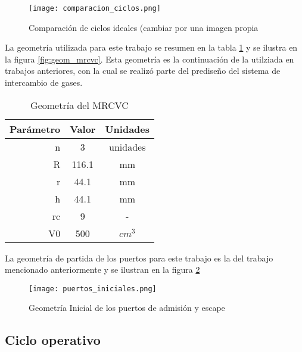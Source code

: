 \begin{figure}
    \centering
    \texttt{[image: comparacion\_ciclos.png]}
    \caption{Comparación de ciclos ideales (cambiar por una imagen propia}
    \label{fig:comparacion_ciclos}
\end{figure}

La geometría utilizada para este trabajo se resumen en la tabla
\ref{tab:geom_mrcvc} y se ilustra en la figura \ref{fig:geom_mrcvc}.
%
Esta geometría es la continuación de la utilziada en trabajos anteriores, con
la cual se realizó parte del prediseño del sistema de intercambio de gases.

\begin{table}
    \centering
    \begin{tabular}{rcc} \toprule
        Parámetro & Valor & Unidades \\ \midrule
        n & 3 & unidades \\
        R & 116.1 & mm \\
        r & 44.1 & mm \\
        h & 44.1 & mm \\
        rc & 9 & - \\
        V0 & 500 & $cm^3$ \\
    \end{tabular}
    \caption{Geometría del MRCVC}
    \label{tab:geom_mrcvc}
\end{table}

La geometría de partida de los puertos para este trabajo es la del trabajo
mencionado anteriormente y se ilustran en la figura \ref{fig:puertos_iniciales}

\begin{figure}
    \centering
    \texttt{[image: puertos\_iniciales.png]}
    \caption{Geometría Inicial de los puertos de admisión y escape}
    \label{fig:puertos_iniciales}
\end{figure}



\subsection{Ciclo operativo}


